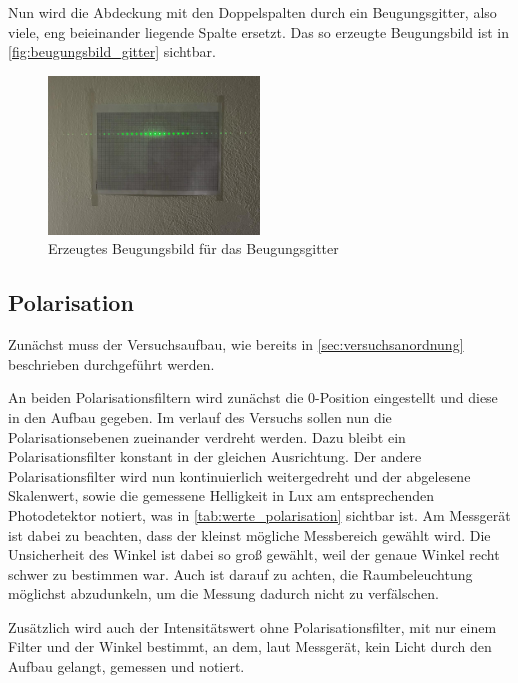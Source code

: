 \documentclass[12pt,english,ngerman]{scrartcl}
\begin{document}
Nun wird die Abdeckung mit den Doppelspalten durch ein Beugungsgitter, also
viele, eng beieinander liegende Spalte ersetzt. Das so erzeugte Beugungsbild
ist in \autoref{fig:beugungsbild_gitter} sichtbar.

\begin{figure}[H]
	\begin{center}
		\includegraphics[width =0.5\textwidth]{./figures/beugungsbild_gitter.jpg}
	\end{center}
	\caption[ Erzeugtes Beugungsbild für das Beugungsgitter] { Erzeugtes Beugungsbild für das
		Beugungsgitter
	}\label{fig:beugungsbild_gitter}
\end{figure}

\subsection{Polarisation}

Zunächst muss der Versuchsaufbau, wie bereits in
\autoref{sec:versuchsanordnung} beschrieben durchgeführt werden.

An beiden Polarisationsfiltern wird zunächst die 0-Position eingestellt und
diese in den Aufbau gegeben. Im verlauf des Versuchs sollen nun die
Polarisationsebenen zueinander verdreht werden. Dazu bleibt ein
Polarisationsfilter konstant in der gleichen Ausrichtung. Der andere
Polarisationsfilter wird nun kontinuierlich weitergedreht und der abgelesene
Skalenwert, sowie die gemessene Helligkeit in Lux am entsprechenden
Photodetektor notiert, was in \autoref{tab:werte_polarisation} sichtbar ist. Am
Messgerät ist dabei zu beachten, dass der kleinst mögliche Messbereich gewählt
wird. Die Unsicherheit des Winkel ist dabei so groß gewählt, weil der genaue
Winkel recht schwer zu bestimmen war. Auch ist darauf zu achten, die
Raumbeleuchtung möglichst abzudunkeln, um die Messung dadurch nicht zu
verfälschen.


Zusätzlich wird auch der Intensitätswert ohne Polarisationsfilter, mit nur
einem Filter und der Winkel bestimmt, an dem, laut Messgerät, kein Licht durch
den Aufbau gelangt, gemessen und notiert.
\end{document}
